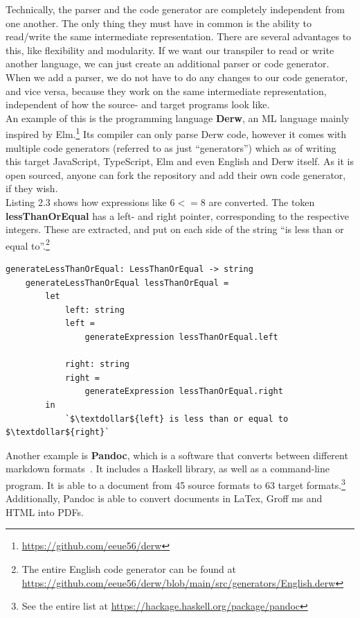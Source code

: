 Technically, the parser and the code generator are completely independent from one another. The only thing they must have in common is the ability to read/write the same intermediate representation. There are several advantages to this, like flexibility and modularity. If we want our transpiler to read or write another language, we can just create an additional parser or code generator. When we add a parser, we do not have to do any changes to our code generator, and vice versa, because they work on the same intermediate representation, independent of how the source- and target programs look like. \hfill \\

An example of this is the programming language \textbf{Derw}, an ML language mainly inspired by Elm.\footnote{\url{https://github.com/eeue56/derw}} Its compiler can only parse Derw code, however it comes with multiple code generators (referred to as just ``generators'') which as of writing this target JavaScript, TypeScript, Elm and even English and Derw itself. As it is open sourced, anyone can fork the repository and add their own code generator, if they wish. \hfill \\

Listing 2.3 shows how expressions like $6 <= 8$ are converted. The token \textbf{lessThanOrEqual} has a left- and right pointer, corresponding to the respective integers. These are extracted, and put on each side of the string ``is less than or equal to''.\footnote{The entire English code generator can be found at \url{https://github.com/eeue56/derw/blob/main/src/generators/English.derw}} \hfill \\

\begin{lstlisting}[caption={The function that converts a ``less than or equal''-expression in Derw to English}, captionpos=b, frame=tlrb]
    generateLessThanOrEqual: LessThanOrEqual -> string
    generateLessThanOrEqual lessThanOrEqual =
        let
            left: string
            left =
                generateExpression lessThanOrEqual.left

            right: string
            right =
                generateExpression lessThanOrEqual.right
        in
            `$\textdollar${left} is less than or equal to $\textdollar${right}`
\end{lstlisting}

Another example is \textbf{Pandoc}, which is a software that converts between different markdown formats~\cite{dominici2014}. It includes a Haskell library, as well as a command-line program. It is able to a document from 45 source formats to 63 target formats.\footnote{See the entire list at \url{https://hackage.haskell.org/package/pandoc}} Additionally, Pandoc is able to convert documents in LaTex, Groff ms and HTML into PDFs. \hfill \\

